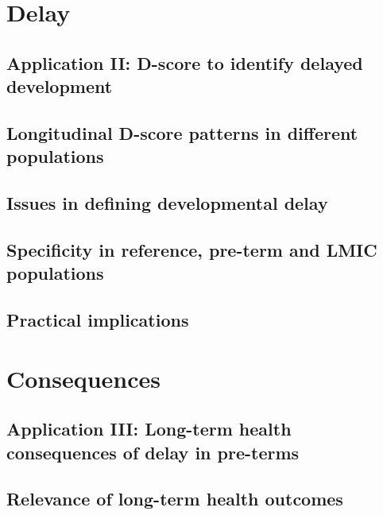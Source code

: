 \documentclass[]{book}
\begin{document}
\chapter{Delay}\label{delay}

\section{Application II: D-score to identify delayed
development}\label{application-ii-d-score-to-identify-delayed-development}

\section{Longitudinal D-score patterns in different
populations}\label{longitudinal-d-score-patterns-in-different-populations}

\section{Issues in defining developmental
delay}\label{issues-in-defining-developmental-delay}

\section{Specificity in reference, pre-term and LMIC
populations}\label{specificity-in-reference-pre-term-and-lmic-populations}

\section{Practical implications}\label{practical-implications}

\chapter{Consequences}\label{consequences}

\section{Application III: Long-term health consequences of delay in
pre-terms}\label{application-iii-long-term-health-consequences-of-delay-in-pre-terms}

\section{Relevance of long-term health
outcomes}\label{relevance-of-long-term-health-outcomes}
\end{document}
